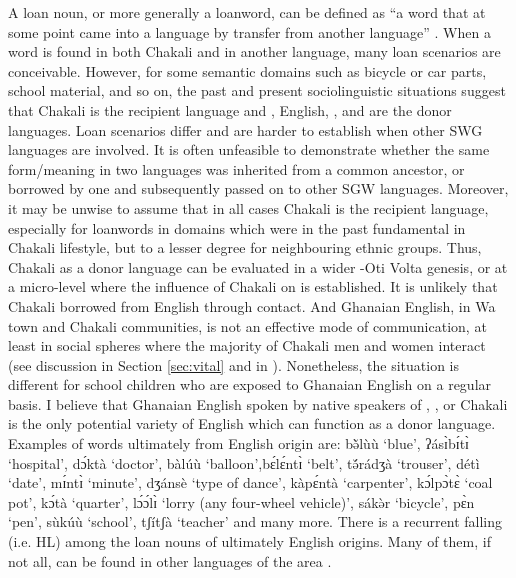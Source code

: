 \begin{exe}
\begin{exe}
\begin{exe}
\begin{exe}
\begin{exe}
\begin{exe}
\begin{exe}
\begin{exe}
A loan noun,  or more generally a loanword, can be defined as  ``a word that at some point came into a language by transfer from another language'' \citep[58]{Hasp08}.  When a word is found in both Chakali and in another language, many loan scenarios are conceivable. However,  for some semantic domains such as   bicycle or car parts, school material, and so on, the past and present sociolinguistic situations  suggest that Chakali is the recipient language and , English, , and   are the donor languages.  Loan scenarios differ and are harder to establish when other SWG languages are involved. It is often unfeasible to demonstrate whether the same form/meaning in two languages was inherited from a common ancestor, or  borrowed by one and subsequently passed on to other SGW languages. Moreover, it may be unwise to assume that in all cases Chakali is  the recipient language, especially for loanwords in domains which  were in the past fundamental in Chakali lifestyle,  but to a lesser degree for neighbouring ethnic groups. Thus, Chakali as a donor language can be evaluated in a wider -Oti Volta genesis, or  at a micro-level where the influence of Chakali on  is established. It is unlikely that Chakali borrowed from English through contact. And Ghanaian English, in Wa town and Chakali communities,  is not an effective mode of communication, at least in social spheres where the majority of  Chakali men and women interact (see discussion in Section \ref{sec:vital} and in \citealt{brin15c}).  Nonetheless, the situation is different for school children  who are exposed to Ghanaian English on a regular basis. I believe that Ghanaian English spoken by native speakers of , , or Chakali  is the only potential variety of English which can function as a donor language. Examples of words ultimately  from English origin are: {\sls bə̆̀lùù} `blue', {\sls ʔásɪ̀bɪ́tɪ̀} `hospital', {\sls dɔ́ktà} `doctor', {\sls bàlúù} `balloon',{\sls bɛ́lɛ́ntɪ̀} `belt',  {\sls tə̆́rádʒà} `trouser',  {\sls détì} `date', {\sls mɪ́ntɪ̀} `minute',   {\sls dʒánsè} `type of dance',  {\sls kàpɛ́ntà} `carpenter', {\sls kɔ́lpɔ̀tɛ̀} `coal pot', {\sls kɔ́tà} `quarter', {\sls lɔ́ɔ́lɪ̀} `lorry (any four-wheel vehicle)',   {\sls sákə̀r} `bicycle',  {\sls pɛ̀n} `pen', {\sls sùkúù} `school',   {\sls tʃítʃà} `teacher' and many more.  There is a recurrent falling  (i.e. HL) among the loan nouns of  ultimately English origins. Many of them,  if not all, can be found in other languages of the area \citep{sisa75, daku07}. 


\end{exe}
\end{exe}
\end{exe}
\end{exe}
\end{exe}
\end{exe}
\end{exe}
\end{exe}
